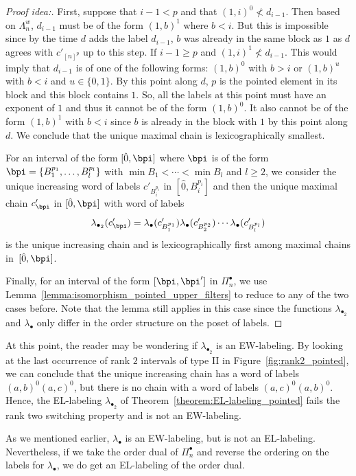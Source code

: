 \begin{proof}[Proof idea:]
First, suppose that $i-1<p$ and that  $(1,i)^0 \not < d_{i-1}$.  Then based on $\Lambda_n^w$, $d_{i-1}$ must be of the form $(1,b)^1$ where $b<i$.  But this is impossible since by the time $d$ adds the label $d_{i-1}$, $b$ was already in the same block as $1$ as $d$ agrees with $c'_{[n]^p}$ up to this step.  If $i-1\geq p$ and $(1,i)^1 \not < d_{i-1}$. This would imply that $d_{i-1}$ is of one of the following forms: $(1,b)^0$ with $b>i$ or $(1,b)^u$ with $b< i$ and $u\in \{0,1\}$.   By this point along $d$, $p$ is the pointed element in its block and this block contains $1$.  So, all the labels at this point must have an exponent of $1$ and thus it cannot be of the form $(1,b)^0$.  It also cannot be  of the form $(1,b)^1$ with $b<i$ since $b$ is already in the block with $1$ by this point along $d$. We conclude that the unique maximal chain is lexicographically smallest. 

For an interval of the form $[\hat{0},\bpi]$ where $\bpi$ is of the form $\bpi=\{B_1^{p_1},\dots,B_l^{p_l}\}$ with $\min B_1 <\cdots <\min B_l$ and $l\ge 2$, we consider the unique increasing word of labels $c'_{B_i^{p_i}}$ in $[\hat{0},B_i^{p_i}]$  and then the unique maximal chain  $c'_{\bpi}$ in  $[\hat{0},\bpi]$ with word of labels
$$\lambda_{\bullet_2}(c'_{\bpi})=\lambda_{\bullet}(c'_{B_1^{p_1}})\lambda_{\bullet}(c'_{B_2^{p_2}})\cdots\lambda_{\bullet}(c'_{B_l^{p_l}})$$
is the unique increasing chain and is lexicographically first among maximal chains  in~$[\hat{0},\bpi]$.

Finally, for an interval of the form $[\bpi, \bpi']$ in $\Pi_n^{\bullet}$, we use Lemma~\ref{lemma:isomorphism_pointed_upper_filters} to reduce to any of the two cases before. Note that the lemma still applies in this case since the functions $\lambda_{\bullet_2}$ and  $\lambda_{\bullet}$    only differ in the  order structure on the poset of labels.
\end{proof}


At this point, the reader may be wondering if  $\lambda_{\bullet_2}$ is an EW-labeling. By looking at the last occurrence of rank $2$ intervals of type II in Figure~\ref{fig:rank2_pointed}, we can conclude that the unique increasing chain has a word of labels $(a,b)^0(a,c)^0$, but there is no chain with a word of labels $(a,c)^0(a,b)^0$. Hence, the EL-labeling $\lambda_{\bullet_2}$ of Theorem~\ref{theorem:EL-labeling_pointed} fails the rank two switching property and is not an EW-labeling.  

As we mentioned earlier, $\lambda_\bullet$ is an EW-labeling, but is not an EL-labeling. Nevertheless, if we take the order dual of $\Pi_n^\bullet$ and reverse the ordering on the labels for $\lambda_{\bullet}$, we do get an EL-labeling of the order dual.  


